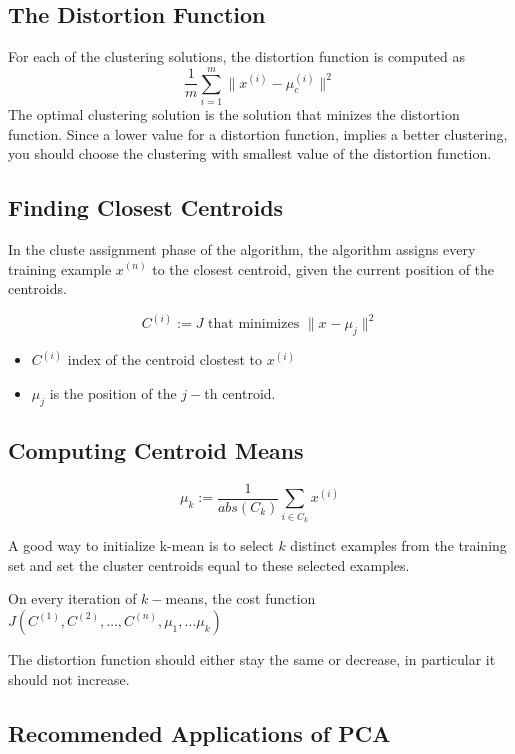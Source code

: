 \subsection{The Distortion Function}
For each of the clustering solutions, the distortion function is computed as 
\[ \frac{1}{m} \sum^{m}_{i=1} \parallel x^{(i)} - \mu_c^{(i)}\parallel ^2 \]
The optimal clustering solution is the solution that minizes the distortion function.
Since a lower value for a distortion function, implies a better clustering, you should choose the clustering with 
smallest value of the distortion function.
\subsection*{Finding Closest Centroids}

In the cluste assignment phase of the algorithm, the algorithm assigns every training example $x^{(n)}$ to the closest 
centroid, given the current position of the centroids.

\[ C^{(i)} := J \mbox{ that minimizes } \| x^{} - \mu_j \| ^2 \]

\begin{itemize}
\item $C^{(i)}$ index of the centroid clostest to $x^{(i)}$
\item $\mu_j$ is the position of the $j-$th centroid.
\end{itemize}

\subsection{Computing Centroid Means}

\[ 
\mu_k := \frac{1}{abs(C_k)} \sum_{i \in C_k} x^{(i)}
\]

A good way to initialize k-mean is to select $k$ distinct examples from the training set and set the cluster centroids equal to these selected examples.

On every iteration of $k-$means, the cost function $J(C^{(1)},C^{(2)},\ldots, C^{(n)},
\mu_1,\ldots \mu_k)$

The distortion function should either stay the same or decrease, in particular it should not increase.

\subsection{Recommended Applications of PCA}


